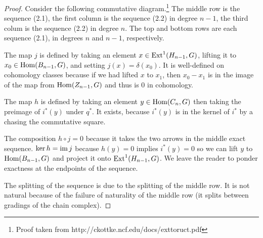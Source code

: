 \begin{proof}
    Consider the following commutative diagram.\footnote{Proof taken from http://ckottke.ncf.edu/docs/exttoruct.pdf} The middle row is the sequence (2.1), the first column is the sequence (2.2) in degree $n-1$, the third colum is the sequence (2.2) in degree $n$. The top and bottom rows are each sequence (2.1), in degrees $n$ and $n-1$, respectively.
    \begin{center}
    \end{center}

    The map $j$ is defined by taking an element $x \in \operatorname{Ext}^1(H_{n-1}, G)$, lifting it to $x_0 \in \operatorname{Hom}(B_{n-1}, G)$, and setting $j(x) = \delta(x_0)$. It is well-defined on cohomology classes because if we had lifted $x$ to $x_1$, then $x_0 - x_1$ is in the image of the map from $\operatorname{Hom}(Z_{n-1}, G)$ and thus is $0$ in cohomology.

    The map $h$ is defined by taking an element $y \in \operatorname{Hom}(C_n, G)$ then taking the preimage of $i^\ast(y)$ under $q^\ast$. It exists, because $i^\ast(y)$ is in the kernel of $i^\ast$ by a chasing the commutative square.

    The composition $h \circ j = 0$ because it takes the two arrows in the middle exact sequence. $\ker{h} = \operatorname{im}{j}$ because $h(y) = 0$ implies $i^\ast(y)=0$ so we can lift $y$ to $\operatorname{Hom}(B_{n-1}, G)$ and project it onto $\operatorname{Ext}^1(H_{n-1}, G)$. We leave the reader to ponder exactness at the endpoints of the sequence.

    The splitting of the sequence is due to the splitting of the middle row. It is not natural because of the failure of naturality of the middle row (it splits between gradings of the chain complex).
\end{proof}

